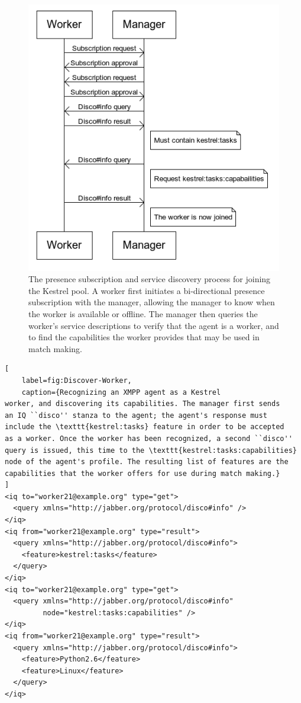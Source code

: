 \begin{figure}
\begin{centering}
\includegraphics[width=12cm]{figures/join_pool}
\end{centering}
\caption{\label{fig:Joining-the-Pool}The presence subscription and service
discovery process for joining the Kestrel pool. A worker first initiates
a bi-directional presence subscription with the manager, allowing
the manager to know when the worker is available or offline. The manager
then queries the worker's service descriptions to verify that the
agent is a worker, and to find the capabilities the worker provides
that may be used in match making.}
\end{figure}


\begin{lstlisting}[
    label=fig:Discover-Worker,
    caption={Recognizing an XMPP agent as a Kestrel
worker, and discovering its capabilities. The manager first sends
an IQ ``disco'' stanza to the agent; the agent's response must
include the \texttt{kestrel:tasks} feature in order to be accepted
as a worker. Once the worker has been recognized, a second ``disco''
query is issued, this time to the \texttt{kestrel:tasks:capabilities}
node of the agent's profile. The resulting list of features are the
capabilities that the worker offers for use during match making.}
]
<iq to="worker21@example.org" type="get">
  <query xmlns="http://jabber.org/protocol/disco#info" />
</iq>
<iq from="worker21@example.org" type="result">
  <query xmlns="http://jabber.org/protocol/disco#info"> 
    <feature>kestrel:tasks</feature> 
  </query> 
</iq>
<iq to="worker21@example.org" type="get"> 
  <query xmlns="http://jabber.org/protocol/disco#info" 
         node="kestrel:tasks:capabilities" /> 
</iq>
<iq from="worker21@example.org" type="result">
  <query xmlns="http://jabber.org/protocol/disco#info">
    <feature>Python2.6</feature>
    <feature>Linux</feature>
  </query>
</iq>
\end{lstlisting}

